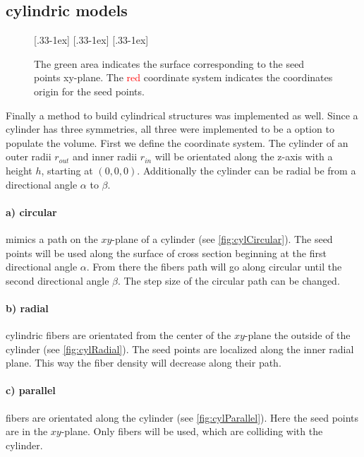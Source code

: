 \subsection{cylindric models}
% 
\begin{figure}[!t]
    \centering
    \def\tikzwidth{0.31\textwidth}
    [.33\textwidth-1ex]{
    }\hfill
    [.33\textwidth-1ex]{
    }\hfill
    [.33\textwidth-1ex]{
    }
	\caption{The green area indicates the surface corresponding to the seed points xy-plane. The \textcolor{red}{red} coordinate system indicates the coordinates origin for the seed points.}
\end{figure}
% 
Finally a method to build cylindrical structures was implemented as well.
Since a cylinder has three symmetries, all three were implemented to be a option to populate the volume.
First we define the coordinate system.
The cylinder of an outer radii $r_{\mathit{out}}$ and inner radii $r_{\mathit{in}}$ will be orientated along the z-axis with a height $h$, starting at $(0,0,0)$.
Additionally the cylinder can be radial be  from a directional angle $\alpha$ to $\beta$.
% 
\paragraph{a) circular} mimics a path on the $xy$-plane of a cylinder (see \cref{fig:cylCircular}).
The seed points will be used along the surface of cross section beginning at the first directional angle $\alpha$.
From there the fibers path will go along circular until the second directional angle $\beta$.
The step size of the circular path can be changed.
% 
\paragraph{b) radial} cylindric fibers are orientated from the center of the $xy$-plane the outside of the cylinder (see \cref{fig:cylRadial}).
The seed points are localized along the inner radial plane.
This way the fiber density will decrease along their path.
% 
\paragraph{c) parallel} fibers are orientated along the cylinder (see \cref{fig:cylParallel}).
Here the seed points are in the $xy$-plane. Only fibers will be used, which are colliding with the cylinder.
% 
